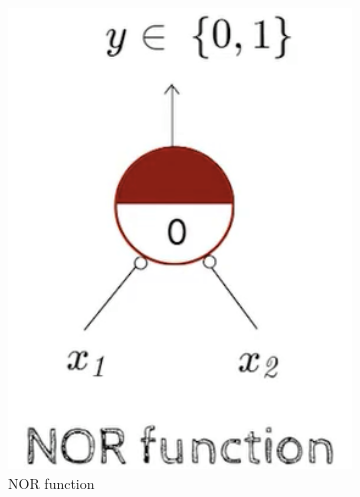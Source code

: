 \documentclass[a4paper]{article}
\begin{document}
\begin{itemize}
\begin{figure}[H]
\begin{subfigure}[b]{0.225\textwidth}
            \includegraphics[width=1\textwidth]{Degree//static/DL_Pitts_NOR.png}
            \caption{NOR function}
            \label{fig:DL-pitts-NOR}
        \end{subfigure}
        \hfill
        \begin{subfigure}[b]{0.225\textwidth}
            \centering

\end{subfigure}
\end{figure}
\end{itemize}
\end{document}

